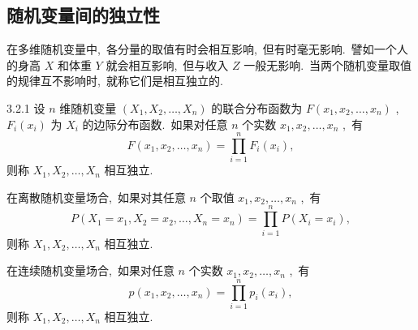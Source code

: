    \subsection{随机变量间的独立性}\label{ssec:3.2.4}
   在多维随机变量中,\ 各分量的取值有时会相互影响,\ 但有时毫无影响.\ 譬如一个人的身高 $X$ 和体重 $Y$ 就会相互影响,\ 但与收入 $Z$ 一般无影响.\ 当两个随机变量取值的规律互不影响时,\ 就称它们是相互独立的.
   \begin{definition}{}{3.2.1}
   	设 $n$ 维随机变量 $(X_1,X_2,\ldots,X_n)$ 的联合分布函数为 $F(x_1,x_2,\ldots,x_n)$ ,\ $F_i(x_i)$ 为 $X_i$ 的边际分布函数.\ 如果对任意 $n$ 个实数 $x_1,x_2,\ldots,x_n$ ,\ 有
   	\begin{equation}\label{eq:3.2.7}
   		F(x_1,x_2,\ldots,x_n)=\prod_{i=1}^{n}F_i(x_i),
   	\end{equation}
   	则称 $X_1,X_2,\ldots,X_n$ 相互独立.
   \end{definition}
   在离散随机变量场合,\ 如果对其任意 $n$ 个取值 $x_1,x_2,\ldots,x_n$ ,\ 有
   \begin{equation}\label{eq:3.2.8}
   	P(X_1=x_1,X_2=x_2,\ldots,X_n=x_n)=\prod_{i=1}^{n}P(X_i=x_i),
   \end{equation}
   则称 $X_1,X_2,\ldots,X_n$ 相互独立.
   
   在连续随机变量场合,\ 如果对任意 $n$ 个实数 $x_1,x_2,\ldots,x_n$ ,\ 有
   \begin{equation}\label{eq:3.2.9}
   	p(x_1,x_2,\ldots,x_n)=\prod_{i=1}^{n}p_i(x_i),
   \end{equation}
   则称 $X_1,X_2,\ldots,X_n$ 相互独立.
   
